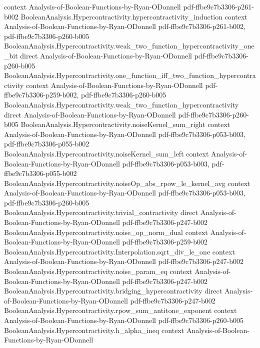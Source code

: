 \begin{theorem}
  {context}
  {Analysis-of-Boolean-Functions-by-Ryan-ODonnell}
  {pdf-ffbe9c7b3306-p261-b002}
\proofstep
  {BooleanAnalysis.Hypercontractivity.hypercontractivity_induction}
  {context}
  {Analysis-of-Boolean-Functions-by-Ryan-ODonnell}
  {pdf-ffbe9c7b3306-p261-b002,
    pdf-ffbe9c7b3306-p260-b005}
\proofstep
  {BooleanAnalysis.Hypercontractivity.weak_two_function_hypercontractivity_one_bit}
  {direct}
  {Analysis-of-Boolean-Functions-by-Ryan-ODonnell}
  {pdf-ffbe9c7b3306-p260-b005}
\proofstep
  {BooleanAnalysis.Hypercontractivity.one_function_iff_two_function_hypercontractivity}
  {context}
  {Analysis-of-Boolean-Functions-by-Ryan-ODonnell}
  {pdf-ffbe9c7b3306-p259-b002,
    pdf-ffbe9c7b3306-p260-b005}
\proofstep
  {BooleanAnalysis.Hypercontractivity.weak_two_function_hypercontractivity}
  {direct}
  {Analysis-of-Boolean-Functions-by-Ryan-ODonnell}
  {pdf-ffbe9c7b3306-p260-b005}
\proofstep
  {BooleanAnalysis.Hypercontractivity.noiseKernel_sum_right}
  {context}
  {Analysis-of-Boolean-Functions-by-Ryan-ODonnell}
  {pdf-ffbe9c7b3306-p053-b003,
    pdf-ffbe9c7b3306-p055-b002}
\proofstep
  {BooleanAnalysis.Hypercontractivity.noiseKernel_sum_left}
  {context}
  {Analysis-of-Boolean-Functions-by-Ryan-ODonnell}
  {pdf-ffbe9c7b3306-p053-b003,
    pdf-ffbe9c7b3306-p055-b002}
\proofstep
  {BooleanAnalysis.Hypercontractivity.noiseOp_abs_rpow_le_kernel_avg}
  {context}
  {Analysis-of-Boolean-Functions-by-Ryan-ODonnell}
  {pdf-ffbe9c7b3306-p053-b003,
    pdf-ffbe9c7b3306-p260-b005}
\proofstep
  {BooleanAnalysis.Hypercontractivity.trivial_contractivity}
  {direct}
  {Analysis-of-Boolean-Functions-by-Ryan-ODonnell}
  {pdf-ffbe9c7b3306-p247-b002}
\proofstep
  {BooleanAnalysis.Hypercontractivity.noise_op_norm_dual}
  {context}
  {Analysis-of-Boolean-Functions-by-Ryan-ODonnell}
  {pdf-ffbe9c7b3306-p259-b002}
\proofstep
  {BooleanAnalysis.Hypercontractivity.Interpolation.sqrt_div_le_one}
  {context}
  {Analysis-of-Boolean-Functions-by-Ryan-ODonnell}
  {pdf-ffbe9c7b3306-p247-b002}
\proofstep
  {BooleanAnalysis.Hypercontractivity.noise_param_eq}
  {context}
  {Analysis-of-Boolean-Functions-by-Ryan-ODonnell}
  {pdf-ffbe9c7b3306-p247-b002}
\proofstep
  {BooleanAnalysis.Hypercontractivity.bridging_hypercontractivity}
  {direct}
  {Analysis-of-Boolean-Functions-by-Ryan-ODonnell}
  {pdf-ffbe9c7b3306-p247-b002}
\proofstep
  {BooleanAnalysis.Hypercontractivity.rpow_sum_antitone_exponent}
  {context}
  {Analysis-of-Boolean-Functions-by-Ryan-ODonnell}
  {pdf-ffbe9c7b3306-p260-b005}
\proofstep
  {BooleanAnalysis.Hypercontractivity.h_alpha_ineq}
  {context}
  {Analysis-of-Boolean-Functions-by-Ryan-ODonnell}

\end{theorem}
